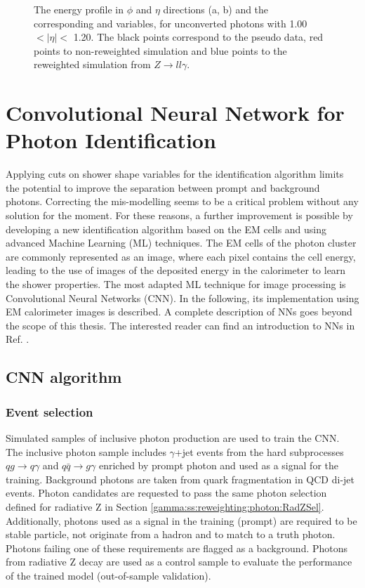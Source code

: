\begin{figure}[htbp]
	\begin{tcolorbox}[colback=black!5!white,colframe=white!75!black]
    \caption{The energy profile in $\phi$ and $\eta$ directions (a, b) and the corresponding \Rphi and \Reta variables, for unconverted photons with 1.00 $ < |\eta| < $ 1.20. The black points correspond to the pseudo data, red points to non-reweighted simulation and blue points to the reweighted simulation from $Z\rightarrow ll\gamma$.}
    \label{fig:gamma:ss:reweighting:photon:3dreweighting}
    \end{tcolorbox}
\end{figure}

\section{Convolutional Neural Network for Photon Identification}
\label{gamma:CNN}
Applying cuts on shower shape variables for the identification algorithm limits the potential to improve the separation between prompt and background photons. Correcting the mis-modelling seems to be a critical problem without any solution for the moment. For these reasons, a further improvement is possible by developing a new identification algorithm based on the EM cells and using advanced Machine Learning (ML) techniques. The EM cells of the photon cluster are commonly represented as an image, where each pixel contains the cell energy, leading to the use of images of the deposited energy in the calorimeter to learn the shower properties. The most adapted ML technique for image processing is Convolutional Neural Networks (CNN). In the following, its implementation using EM calorimeter images is described. A complete description of NNs goes beyond the scope of this thesis. The interested reader can find an introduction to NNs in Ref. \cite{NNs}. 

\subsection{CNN algorithm}
\subsubsection{Event selection}
Simulated samples of inclusive photon production are used to train the CNN. The inclusive photon sample includes $\gamma$+jet events from the hard subprocesses $qg \rightarrow q\gamma$ and $ q\bar{q}\rightarrow g\gamma$ enriched by prompt photon and used as a signal for the training. Background photons are taken from quark fragmentation in QCD di-jet events. Photon candidates are requested to pass the same photon selection defined for radiative Z in Section \ref{gamma:ss:reweighting:photon:RadZSel}. Additionally, photons used as a signal in the training (prompt) are required to be stable particle, not originate from a hadron and to match to a truth photon. Photons failing one of these requirements are flagged as a background. Photons from radiative Z decay are used as a control sample to evaluate the performance of the trained model (out-of-sample validation).

